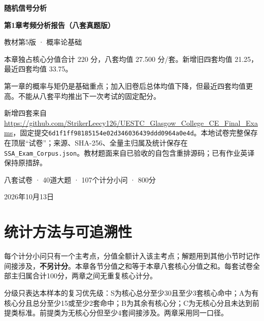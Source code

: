 \documentclass[11pt,fontset=fandol]{ctexart}
\begin{document}
\begin{titlepage}\centering\vspace*{2cm}

{\Huge\bfseries 随机信号分析}\par\vspace{1cm}

{\LARGE\bfseries 第1章考频分析报告（八套真题版）}\par\vspace{1cm}

{\large 教材第5版 · 概率论基础}\par\vspace{1cm}

\begin{keybox}[title=样本扩充后的结论]

本章独占核心分值合计 220 分，八套均值 27.500 分/套。新增旧四套均值 21.25，最近四套均值 33.75。

第一章的概率与矩仍是基础重点；加入旧卷后总体均值下降，但最近四套均值更高。不能从八套平均推出下一次考试的固定配分。

\end{keybox}\par\bigskip\begin{minipage}{\textwidth}\small\RaggedRight 新增四套来自\url{https://github.com/StrikerLeecy126/UESTC_Glasgow_College_CE_Final_Exams}，固定提交\texttt{6d1f1ff98185154e02d346036439ddd0964a0e4d}。本地试卷完整保存在顶层“试卷”；来源、SHA-256、全量主归属及统计保存在\texttt{SSA\_Exam\_Corpus.json}。教材题面来自已验收的自包含重排源码；已有作业英译保持原措辞。\end{minipage}\vfill 八套试卷 · 40道大题 · 107个计分小问 · 800分\par 2026年10月13日\end{titlepage}

\tableofcontents\clearpage

\section{统计方法与可追溯性}

每个计分小问只有一个主考点，分值全额计入该主考点；解题用到其他小节时记作间接涉及，\textbf{不另计分}。本章各节分值之和等于本章八套核心分值之和。每套试卷全部主归属合计100分，两章之间无重复核心计分。

分级只表达本样本的复习优先级：S为核心总分至少30且至少3套核心命中；A为有核心分且总分至少15或至少2套命中；B为其余有核心分；C为无核心分且未达到前提类标准。前提类为无核心分但至少4套间接涉及。两章采用同一口径。
\end{document}
